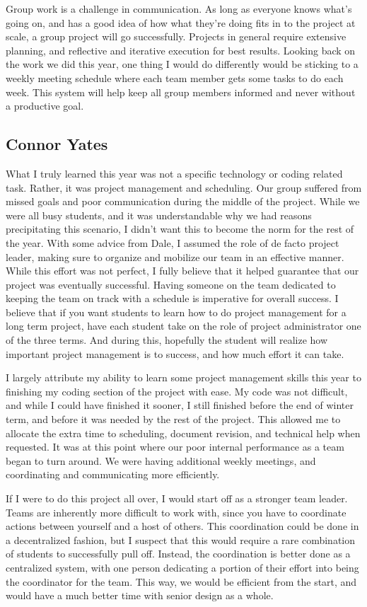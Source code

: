 Group work is a challenge in communication. As long as everyone knows what's going on, and has a good idea of how what they're doing fits in to the project at scale,
a group project will go successfully. Projects in general require extensive planning, and reflective and iterative execution for best results. Looking back on the work
we did this year, one thing I would do differently would be sticking to a weekly meeting schedule where each team member gets some tasks to do each week. This system
will help keep all group members informed and never without a productive goal.

\subsection{Connor Yates}
What I truly learned this year was not a specific technology or coding related task. Rather, it was project management and scheduling. Our group suffered from missed goals and poor communication during the middle of the project. While we were all busy students, and it was understandable why we had reasons precipitating this scenario, I didn't want this to become the norm for the rest of the year. With some advice from Dale, I assumed the role of de facto project leader, making sure to organize and mobilize our team in an effective manner. While this effort was not perfect, I fully believe that it helped guarantee that our project was eventually successful. Having someone on the team dedicated to keeping the team on track with a schedule is imperative for overall success. I believe that if you want students to learn how to do project management for a long term project, have each student take on the role of project administrator one of the three terms. And during this, hopefully the student will realize how important project management is to success, and how much effort it can take.

I largely attribute my ability to learn some project management skills this year to finishing my coding section of the project with ease. My code was not difficult, and while I could have finished it sooner, I still finished before the end of winter term, and before it was needed by the rest of the project. This allowed me to allocate the extra time to scheduling, document revision, and technical help when requested. It was at this point where  our poor internal performance as a team began to turn around. We were having additional weekly meetings, and coordinating and communicating more efficiently.

If I were to do this project all over, I would start off as a stronger team leader. Teams are inherently more difficult to work with, since you have to coordinate actions between yourself and a host of others. This coordination could be done in a decentralized fashion, but I suspect that this would require a rare combination of students to successfully pull off. Instead, the coordination is better done as a centralized system, with one person dedicating a portion of their effort into being the coordinator for the team. This way, we would be efficient from the start, and would have a much better time with senior design as a whole.
